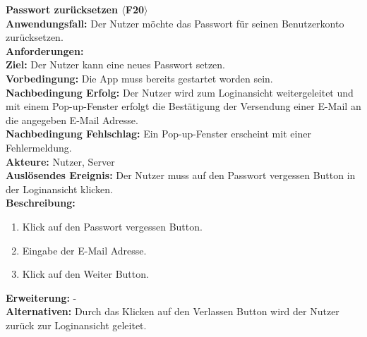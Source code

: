 \documentclass[parskip=full]{scrartcl}
\begin{document}
\textbf{Passwort zurücksetzen $\langle$F20$\rangle$}\\
\textbf{Anwendungsfall:} Der Nutzer möchte das Passwort für seinen Benutzerkonto zurücksetzen.\\
\textbf{Anforderungen:} \\
\textbf{Ziel:} Der Nutzer kann eine neues Passwort setzen.\\
\textbf{Vorbedingung:} Die App muss bereits gestartet worden sein.\\
\textbf{Nachbedingung Erfolg:} Der Nutzer wird zum Loginansicht weitergeleitet und mit einem Pop-up-Fenster erfolgt die Bestätigung der Versendung einer E-Mail an die angegeben E-Mail Adresse.\\
\textbf{Nachbedingung Fehlschlag:} Ein Pop-up-Fenster erscheint mit einer Fehlermeldung.\\
\textbf{Akteure:} Nutzer, Server\\
\textbf{Auslösendes Ereignis:} Der Nutzer muss auf den Passwort vergessen Button in der Loginansicht klicken.\\
\textbf{Beschreibung:}
\begin{enumerate}
    \item Klick auf den Passwort vergessen Button.
    \item Eingabe der E-Mail Adresse.
    \item Klick auf den Weiter Button.
\end{enumerate}
\textbf{Erweiterung:} -\\
\textbf{Alternativen:} Durch das Klicken auf den Verlassen Button wird der Nutzer zurück zur Loginansicht geleitet.\\
\newpage
\end{document}
